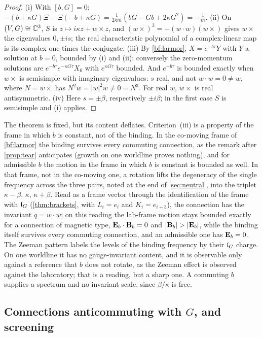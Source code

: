 \begin{proof}
(i) With $[b,G]=0$: $-(b+\kappa G)\Xi-\Xi(-b+\kappa G)=\frac1{2\kappa m}(bG-Gb+2\kappa G^2)=-\frac1m$. (ii) On $(V,G)\cong\mathbb{C}^3$, $S$ is
$z\mapsto i\kappa z+w\times z$, and $(w\times)^3=-(w\cdot w)(w\times)$ gives $w\times$ the eigenvalues $0,\pm is$; the real characteristic polynomial
of a complex-linear map is its complex one times the conjugate. (iii) By \cref{bf:larmor}, $X=e^{-b\tau}Y$ with $Y$ a solution at $b=0$, bounded by
(i) and (ii); conversely the zero-momentum solutions are $e^{-b\tau}e^{-\kappa G\tau}X_0$ with $e^{\kappa G\tau}$ bounded. And $e^{-b\tau}$ is bounded
exactly when $w\times$ is semisimple with imaginary eigenvalues: $s$ real, and not $w\cdot w=0\neq w$, where $N=w\times$ has
$N^2\bar w=|w|^2w\neq0=N^3$. For real $w$, $w\times$ is real antisymmetric. (iv) Here $s=\pm\beta$, respectively $\pm i\beta$; in the first case $S$ is
semisimple and (i) applies.
\end{proof}

The theorem is fixed, but its content deflates. Criterion~(iii) is a property of the frame in which $b$ is constant, not of the binding. In the
co-moving frame of \cref{bf:larmor} the binding survives every commuting connection, as the remark after \cref{prop:tear} anticipates (growth on
one worldline proves nothing), and for admissible $b$ the motion in the frame in which $b$ is constant is bounded as well. In that frame, not in the co-moving one, a rotation lifts the degeneracy of the single
frequency across the three pairs, noted at the end of \cref{sec:neutral}, into the triplet $\kappa-\beta$, $\kappa$, $\kappa+\beta$. Read as a
frame vector through the identification of the frame with $\mathfrak l_G$ (\cref{thm:brackets}, with $L_i=e_i$ and $K_i=e_{i+3}$), the connection
has the invariant $q=w\cdot w$; on this reading the lab-frame motion stays bounded exactly for a connection of magnetic type, $\mathbf E_b\cdot\mathbf B_b=0$ and
$|\bB_b|>|\bE_b|$, while the binding itself survives every commuting connection, and an admissible one has $\mathbf E_b=0$. The Zeeman pattern labels the
levels of the binding frequency by their $\mathfrak l_G$ charge. On one worldline it has no gauge-invariant content, and it is observable only against a
reference that $b$ does not rotate, as the Zeeman effect is observed against the laboratory; that is a reading, but a sharp one. A commuting $b$
supplies a spectrum and no invariant scale, since $\beta/\kappa$ is free.

\subsection{\texorpdfstring{Connections anticommuting with $G$, and screening}{Connections anticommuting with G, and screening}}
\label{sec:bf-anticommuting}

